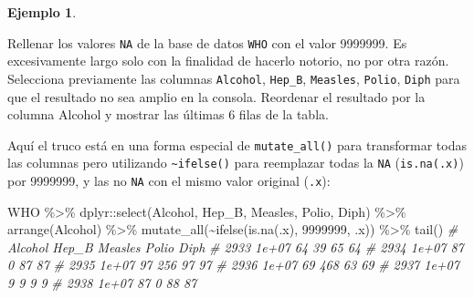 \documentclass[
]{article}
\newenvironment{Shaded}{\begin{snugshade}}{\end{snugshade}}
\newcommand{\CommentTok}[1]{\textcolor[rgb]{0.56,0.35,0.01}{\textit{#1}}}
\newcommand{\DecValTok}[1]{\textcolor[rgb]{0.00,0.00,0.81}{#1}}
\newcommand{\FunctionTok}[1]{\textcolor[rgb]{0.00,0.00,0.00}{#1}}
\newcommand{\NormalTok}[1]{#1}
\newcommand{\SpecialCharTok}[1]{\textcolor[rgb]{0.00,0.00,0.00}{#1}}
\theoremstyle{definition}
\theoremstyle{definition}
\newtheorem{example}{Ejemplo}[section]
\theoremstyle{definition}
\theoremstyle{definition}
\theoremstyle{remark}
\begin{document}
\begin{example}
\protect\hypertarget{exm:na11}{}\label{exm:na11}

Rellenar los valores \texttt{NA} de la base de datos \texttt{WHO} con el valor 9999999. Es excesivamente largo solo con la finalidad de hacerlo notorio, no por otra razón. Selecciona previamente las columnas \texttt{Alcohol}, \texttt{Hep\_B}, \texttt{Measles}, \texttt{Polio}, \texttt{Diph} para que el resultado no sea amplio en la consola. Reordenar el resultado por la columna Alcohol y mostrar las últimas 6 filas de la tabla.

Aquí el truco está en una forma especial de \texttt{mutate\_all()} para transformar todas las columnas pero utilizando \texttt{\textasciitilde{}ifelse()} para reemplazar todas la \texttt{NA} (\texttt{is.na(.x)}) por 9999999, y las no \texttt{NA} con el mismo valor original (\texttt{.x}):

\begin{Shaded}
\begin{Highlighting}[]
\NormalTok{WHO }\SpecialCharTok{\%\textgreater{}\%} 
\NormalTok{  dplyr}\SpecialCharTok{::}\FunctionTok{select}\NormalTok{(Alcohol, Hep\_B, Measles, Polio, Diph) }\SpecialCharTok{\%\textgreater{}\%} 
  \FunctionTok{arrange}\NormalTok{(Alcohol) }\SpecialCharTok{\%\textgreater{}\%} 
  \FunctionTok{mutate\_all}\NormalTok{(}\SpecialCharTok{\textasciitilde{}}\FunctionTok{ifelse}\NormalTok{(}\FunctionTok{is.na}\NormalTok{(.x), }\DecValTok{9999999}\NormalTok{, .x)) }\SpecialCharTok{\%\textgreater{}\%} 
  \FunctionTok{tail}\NormalTok{() }
\CommentTok{\#      Alcohol Hep\_B Measles Polio Diph}
\CommentTok{\# 2933   1e+07    64      39    65   64}
\CommentTok{\# 2934   1e+07    87       0    87   87}
\CommentTok{\# 2935   1e+07    97     256    97   97}
\CommentTok{\# 2936   1e+07    69     468    63   69}
\CommentTok{\# 2937   1e+07     9       9     9    9}
\CommentTok{\# 2938   1e+07    87       0    88   87}
\end{Highlighting}
\end{Shaded}

\end{example}
\end{document}
